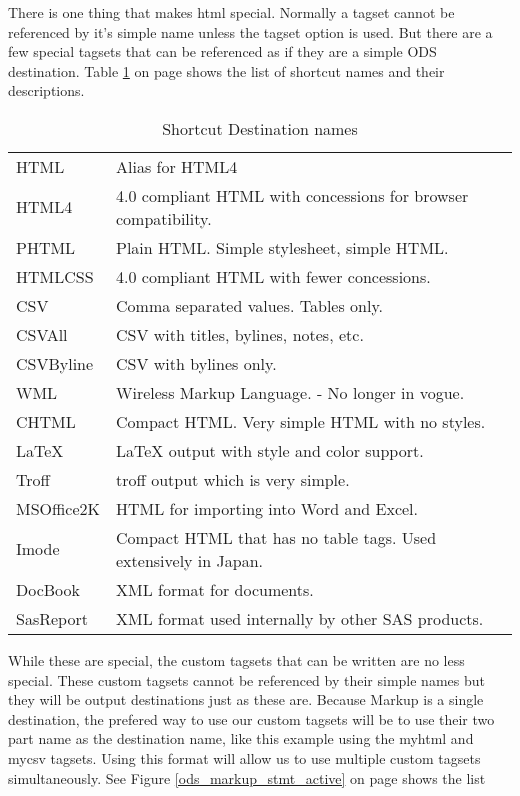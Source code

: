 There is one thing that makes html special.  Normally a tagset cannot be referenced by
it's simple name unless the tagset option is used. But there are a few special tagsets that
can be referenced as if they are a simple ODS destination.  
Table \ref{shortcut_destinations} on page \pageref{shortcut_destinations} shows the list
of shortcut names and their descriptions.


\begin{table}\caption{Shortcut Destination names}
\label{shortcut_destinations}
\begin{tabular}{l|l}
\hline
HTML &  Alias for HTML4 \\
HTML4 & 4.0 compliant HTML with concessions for browser compatibility. \\
PHTML & Plain HTML.  Simple stylesheet, simple HTML. \\
HTMLCSS & 4.0 compliant HTML with fewer concessions. \\
CSV &  Comma separated values.  Tables only. \\
CSVAll & CSV with titles, bylines, notes, etc. \\
CSVByline & CSV with bylines only. \\
WML &  Wireless Markup Language. - No longer in vogue. \\
CHTML & Compact HTML. Very simple HTML with no styles. \\
LaTeX & LaTeX output with style and color support. \\
Troff & troff output which is very simple. \\
MSOffice2K & HTML for importing into Word and Excel. \\
Imode & Compact HTML that has no table tags.  Used extensively in Japan. \\
DocBook &  XML format for documents. \\
SasReport & XML format used internally by other SAS products.
\end{tabular}
\end{table}

While these are special, the custom tagsets that can be written are no less special.  These
custom tagsets cannot be referenced by their simple names but they will be output destinations just
as these are.  Because Markup is a single destination, the prefered way to use our custom 
tagsets will be to use their two part name as the destination name, like this example using 
the myhtml and mycsv tagsets.  Using this format will allow us to use multiple custom 
tagsets simultaneously.
See Figure \ref{ods_markup_stmt_active} on page \pageref{ods_markup_stmt_active} shows the list

